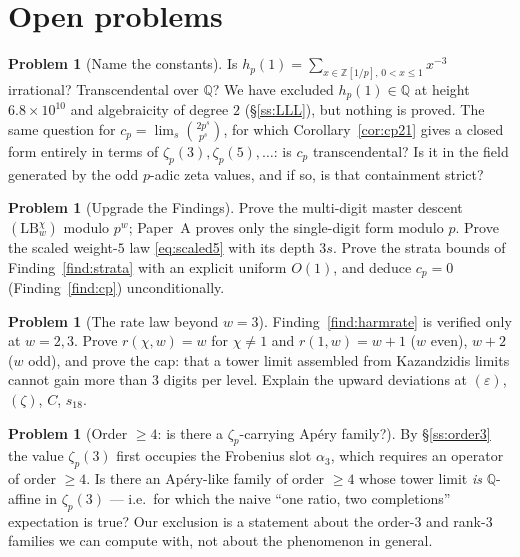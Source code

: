 \documentclass[11pt,reqno]{article}
\newcommand{\QQ}{\mathbb{Q}}
\newcommand{\ZZ}{\mathbb{Z}}
\newcommand{\bin}[2]{\binom{#1}{#2}}
\theoremstyle{plain}
\theoremstyle{definition}
\newtheorem{problem}[theorem]{Problem}
\theoremstyle{remark}
\numberwithin{equation}{section}
\begin{document}
\section{Open problems}\label{sec:open}

\begin{problem}[Name the constants]\label{prob:name}
Is $h_p(1)=\sum_{x\in\ZZ[1/p],\,0<x\le1}x^{-3}$ irrational?  Transcendental
over $\QQ$?  We have excluded $h_p(1)\in\QQ$ at height $6.8\times10^{10}$ and
algebraicity of degree $2$ (\S\ref{ss:LLL}), but nothing is proved.  The same
question for $c_p=\lim_s\bin{2p^s}{p^s}$, for which Corollary~\ref{cor:cp21}
gives a closed form entirely in terms of $\zeta_p(3),\zeta_p(5),\dots$: is
$c_p$ transcendental?  Is it in the field generated by the odd $p$-adic zeta
values, and if so, is that containment strict?
\end{problem}

\begin{problem}[Upgrade the Findings]\label{prob:upgrade}
Prove the multi-digit master descent $(\mathrm{LB}_w^\chi)$ modulo $p^{w}$;
Paper~A \cite{PaperA-inprep} proves only the single-digit form modulo $p$.
Prove the scaled weight-$5$ law \eqref{eq:scaled5} with its depth $3s$.  Prove
the strata bounds of Finding~\ref{find:strata} with an explicit uniform $O(1)$,
and deduce $c_p=0$ (Finding~\ref{find:cp}) unconditionally.
\end{problem}

\begin{problem}[The rate law beyond $w=3$]\label{prob:rate}
Finding~\ref{find:harmrate} is verified only at $w=2,3$.  Prove
$r(\chi,w)=w$ for $\chi\ne1$ and $r(1,w)=w+1$ ($w$ even), $w+2$ ($w$ odd), and
prove the cap: that a tower limit assembled from Kazandzidis limits cannot gain
more than $3$ digits per level.  Explain the upward deviations at
$(\varepsilon)$, $(\zeta)$, $C$, $s_{18}$.
\end{problem}

\begin{problem}[Order $\ge4$: is there a $\zeta_p$-carrying Ap\'ery family?]\label{prob:order4}
By \S\ref{ss:order3} the value $\zeta_p(3)$ first occupies the Frobenius slot
$\alpha_3$, which requires an operator of order $\ge4$.  Is there an
Ap\'ery-like family of order $\ge4$ whose tower limit \emph{is}
$\QQ$-affine in $\zeta_p(3)$ --- i.e.\ for which the naive ``one ratio, two
completions'' expectation is true?  Our exclusion is a statement about the
order-$3$ and rank-$3$ families we can compute with, not about the phenomenon in
general.
\end{problem}
\end{document}
